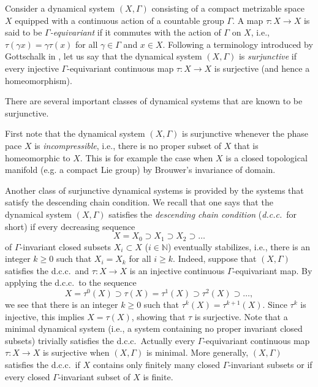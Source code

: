 \documentclass[12pt,a4paper]{amsart}
\theoremstyle{definition}
\numberwithin{equation}{section}
\begin{document}
Consider a dynamical system $(X,\Gamma)$ consisting of a compact metrizable space $X$ equipped with a continuous action of a countable group $\Gamma$.
A map $\tau \colon X \to X$ is said to be \emph{$\Gamma$-equivariant} if it commutes with the action of $\Gamma$ on $X$, i.e., 
$\tau(\gamma x) = \gamma \tau(x)$ for all $\gamma \in \Gamma$ and $x \in X$.
Following a terminology introduced by Gottschalk in \cite{gottschalk},
let us say that the dynamical system $(X,\Gamma)$ is \emph{surjunctive} if every 
injective $\Gamma$-equivariant continuous map
$\tau \colon X \to X$ is surjective (and hence a homeomorphism).
\par
There are several important classes of dynamical systems that are known to be surjunctive.
\par
First note that the dynamical system  $(X,\Gamma)$ is surjunctive whenever  the phase pace $X$ is \emph{incompressible}, i.e., there is no proper subset of $X$ 
that is  homeomorphic to $X$.
This is for example the case when $X$ is a closed topological manifold (e.g. a compact Lie group) by Brouwer's invariance of domain.
\par
Another class of surjunctive dynamical systems is provided  by the systems that satisfy the descending chain condition.
We recall that one says that the dynamical system  $(X,\Gamma)$ satisfies the \emph{descending chain condition} (\emph{d.c.c.}\ for short)  if every decreasing sequence
$$
X = X_0 \supset X_1 \supset X_2 \supset \dots
$$
of $\Gamma$-invariant closed subsets $X_i \subset X$ ($i \in {\mathbb{N}}$) eventually stabilizes, i.e., there is an integer $k \geq 0$ such that
$X_i = X_k$ for all $i \geq k$.
Indeed, suppose that $(X,\Gamma)$ satisfies the d.c.c.\ and $\tau \colon X \to X$ is an injective continuous $\Gamma$-equivariant map.
  By applying the d.c.c.\ to the sequence
  $$
  X= \tau^0(X) \supset \tau(X) = \tau^1(X) \supset \tau^2(X) \supset \dots,
  $$
  we see that there is an integer $k \geq 0$ such that
  $\tau^k(X) = \tau^{k + 1}(X)$.
Since $\tau^k$ is injective, this implies 
$X = \tau(X)$, showing that $\tau$ is surjective.
  Note that a minimal dynamical system
  (i.e., a system containing no proper invariant closed subsets)
   trivially satisfies the d.c.c.\
  Actually every $\Gamma$-equivariant continuous map $\tau \colon X \to X$ is surjective when 
  $(X,\Gamma)$ is minimal.
  More generally, $(X,\Gamma)$ satisfies the d.c.c.\ if $X$ contains only finitely many closed 
  $\Gamma$-invariant subsets or if every closed $\Gamma$-invariant subset of $X$ is finite. 
  \par
\end{document}
